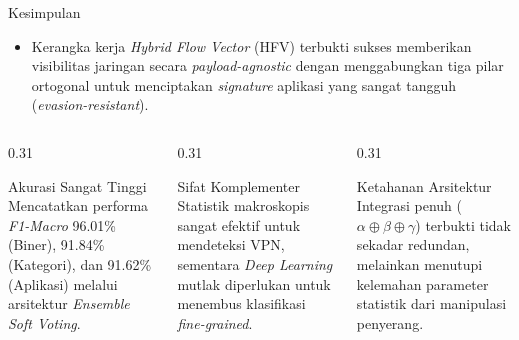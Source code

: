 \documentclass[
  aspectratio=169,
]{beamer}
\begin{document}
\begin{frame}{Kesimpulan}{}

    \begin{itemize}
        \item Kerangka kerja \textit{Hybrid Flow Vector} (HFV) terbukti sukses memberikan visibilitas jaringan secara \textit{payload-agnostic} dengan menggabungkan tiga pilar ortogonal untuk menciptakan \textit{signature} aplikasi yang sangat tangguh (\textit{evasion-resistant}).
    \end{itemize}
    
    \vspace{0.4cm}
    
    \begin{columns}[T,onlytextwidth]
        \begin{column}{0.31\textwidth}
            \begin{block}{Akurasi Sangat Tinggi}
            Mencatatkan performa \textit{F1-Macro} 96.01\% (Biner), 91.84\% (Kategori), dan 91.62\% (Aplikasi) melalui arsitektur \textit{Ensemble Soft Voting}.
            \end{block}
        \end{column}
        \hfill
        \begin{column}{0.31\textwidth}
            \begin{block}{Sifat Komplementer}
            Statistik makroskopis sangat efektif untuk mendeteksi VPN, sementara \textit{Deep Learning} mutlak diperlukan untuk menembus klasifikasi \textit{fine-grained}.
            \end{block}
        \end{column}
        \hfill
        \begin{column}{0.31\textwidth}
            \begin{alertblock}{Ketahanan Arsitektur}
            Integrasi penuh ($\alpha \oplus \beta \oplus \gamma$) terbukti tidak sekadar redundan, melainkan menutupi kelemahan parameter statistik dari manipulasi penyerang.
            \end{alertblock}
        \end{column}
    \end{columns}

\end{frame}
\end{document}

